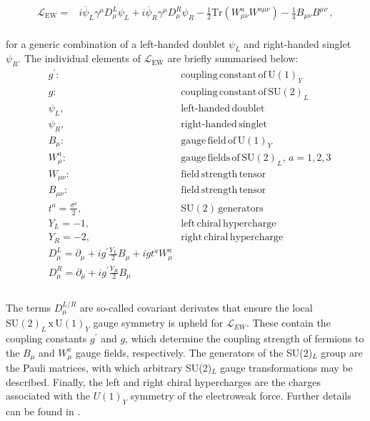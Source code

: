 \begin{align}
    \label{LEWK} 
    \mathcal{L}_{\mathrm{EW}}= &i \overline{\psi}_L \gamma^{\mu} D_{\mu}^L \psi_L + i \overline{\psi}_R \gamma^{\mu} D_{\mu}^R \psi_R
    - \frac{1}{2} \mathrm{Tr} \left(W_{\mu\nu}^{a}W^{a\mu\nu} \right) 
     - \frac{1}{4} B_{\mu\nu}B^{\mu\nu} \, ,
\end{align}
\\
for a generic combination of a left-handed doublet $\psi_L$ and right-handed singlet $\psi_R$. The individual elements of $\mathcal{L}_{\mathrm{EW}}$ are briefly summarised below:
\\
\begin{align*}
    &g^{\prime}: &\mathrm{coupling}\, \mathrm{constant} \, \mathrm{of} \, \mathrm{U(1)}_Y \\
    &g: &\mathrm{coupling}\, \mathrm{constant} \, \mathrm{of} \, \mathrm{SU(2)}_L \\
    &\psi_L, & \textrm{left-handed} \, \mathrm{doublet}\\
    &\psi_R,  &\textrm{right-handed} \, \mathrm{singlet} \\
    &B_{\mu}: &\mathrm{gauge} \, \mathrm{field}\, \mathrm{of} \, \mathrm{U(1)}_Y\\
    &W_{\mu}^a : &\mathrm{gauge} \, \mathrm{fields} \, \mathrm{of} \, \mathrm{SU(2)}_L, \, a = 1,2,3 \\
    &W_{\mu\nu}: &\mathrm{field}\, \mathrm{strength}\,  \mathrm{tensor} \\
    &B_{\mu\nu}: &\mathrm{field}\, \mathrm{strength}\,  \mathrm{tensor} \\
    &t^{a} = \frac{\sigma^{a}}{2}, &\mathrm{SU(2)}\, \mathrm{generators} \\
    &Y_L = -1, &\mathrm{left} \, \mathrm{chiral} \, \mathrm{hypercharge}\\
    &Y_R = -2, &\mathrm{right} \, \mathrm{chiral} \, \mathrm{hypercharge}\\
    &D_{\mu}^L = \partial_{\mu}+ig^{\prime} \frac{Y_L}{2}B_{\mu}+igt^{a}W^{a}_{\mu}\\
    &D_{\mu}^R = \partial_{\mu}+ig^{\prime} \frac{Y_R}{2}B_{\mu}\\
\end{align*}
\\
The terms $D_{\mu}^{L/R}$ are so-called covariant derivates that ensure the local $\mathrm{SU}(2)_L \, \mathrm{x} \, \mathrm{U}(1)_{Y}$ gauge symmetry is upheld for $\mathcal{L}_{EW}$. These contain the coupling constants $g^{\prime}$ and $g$, which determine the coupling strength of fermions to the $B_{\mu}$ and $W^{a}_{\mu}$ gauge fields, respectively. The generators of the SU(2)$_{L}$ group are the Pauli matrices, with which arbitrary SU(2)$_{L}$ gauge transformations may be described. Finally, the left and right chiral hypercharges are the charges associated with the $U(1)_{\mathit{Y}}$ symmetry of the electroweak force. Further details can be found in \cite{WolfHiggs}. \\
